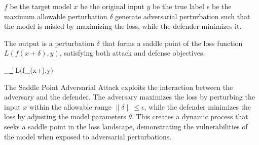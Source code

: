 
\( f \) be the target model
\( x \) be the original input 
\( y \) be the true label
\( \epsilon \) be the maximum allowable perturbation
\( \delta \) generate adversarial perturbation such that the model is misled by maximizing the loss, while the defender minimizes it.

The output is a perturbation \( \delta \) that forms a saddle point of the loss function \( L(f(x + \delta), y) \), satisfying both attack and defense objectives.

\min_{\theta}\max_{\|\delta\|\le\epsilon} L\bigl(f_{\theta}(x+\delta),y\bigr)

The Saddle Point Adversarial Attack exploits the interaction between the adversary and the defender. The adversary maximizes the loss by perturbing the input \( x \) within the allowable range \( \|\delta\| \leq \epsilon \), while the defender minimizes the loss by adjusting the model parameters \( \theta \). This creates a dynamic process that seeks a saddle point in the loss landscape, demonstrating the vulnerabilities of the model when exposed to adversarial perturbations.